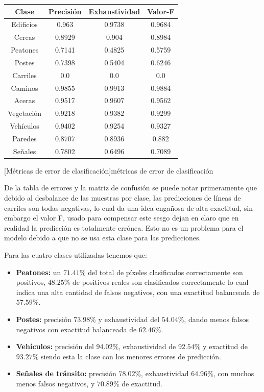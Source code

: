 	\begin{center}
		\footnotesize
		\begin{tabular}{|c|c|c|c|}
			\hline
			\textbf{Clase} & \textbf{Precisión} & \textbf{Exhaustividad} & \textbf{Valor-F}\\
			\hline
			Edificios  & 0.963 & 0.9738 & 0.9684\\
			\hline
			Cercas     & 0.8929 & 0.904 & 0.8984\\
			\hline
			Peatones   & 0.7141 & 0.4825 & 0.5759\\
			\hline
			Postes     & 0.7398 & 0.5404 & 0.6246\\
			\hline
			Carriles   & 0.0 & 0.0 & 0.0\\
			\hline
			Caminos    & 0.9855 & 0.9913 & 0.9884\\
			\hline
			Aceras     & 0.9517 & 0.9607 & 0.9562\\
			\hline
			Vegetación & 0.9218 & 0.9382 & 0.9299\\
			\hline
			Vehículos  & 0.9402 & 0.9254 & 0.9327\\
			\hline
			Paredes    & 0.8707 & 0.8936 & 0.882\\
			\hline
			Señales    & 0.7802 & 0.6496 & 0.7089\\
			\hline
		\end{tabular}
		[Métricas de error de clasificación]{métricas de error de clasificación}\label{metricas}
	\end{center}

	De la tabla de errores y la matriz de confusión se puede notar primeramente que debido al desbalance de las muestras por clase, las predicciones de líneas de carriles son todas negativas, lo cual da una idea engañosa de alta exactitud, sin embargo el valor F, usado para compensar este sesgo dejan en claro que en realidad la predicción es totalmente errónea. Esto no es un problema para el modelo debido a que no se usa esta clase para las predicciones.
	
	Para las cuatro clases utilizadas tenemos que:
	\begin{itemize}
		\item \textbf{Peatones:} un $71.41\%$ del total de píxeles clasificados correctamente son positivos, $48.25\%$ de positivos reales son clasificados correctamente lo cual indica una alta cantidad de falsos negativos, con una exactitud balanceada de $57.59\%$.
		\item \textbf{Postes:} precisión $73.98\%$ y exhaustividad del $54.04\%$, dando menos falsos negativos con exactitud balanceada de $62.46\%$.
		\item \textbf{Vehículos:} precisión del $94.02\%$, exhaustividad de $92.54\%$ y exactitud de $93.27\%$ siendo esta la clase con los menores errores de predicción.
		\item \textbf{Señales de tránsito:} precisión $78.02\%$, exhaustividad $64.96\%$, con muchos menos falsos negativos, y $70.89\%$ de exactitud.
	\end{itemize}
	
